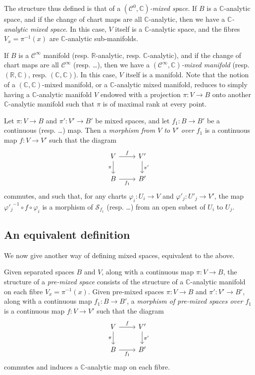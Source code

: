 \documentclass{article}
\theoremstyle{plain}
\theoremstyle{definition}
\newcommand{\RR}{\mathbb{R}}
\newcommand{\CC}{\mathbb{C}}
\newcommand{\oldpage}[1]{\marginpar{\footnotesize$\Big\vert$ \textit{p.~#1}}}
\begin{document}
The structure thus defined is that of a \emph{$(\mathscr{C}^0,\CC)$-mixed space}.
If $B$ is a $\CC$-analytic space, and if the change of chart maps are all $\CC$-analytic, then we have a \emph{$\CC$-analytic mixed space}.
In this case, $V$ itself is a $\CC$-analytic space, and the fibres $V_x=\pi^{-1}(x)$ are $\CC$-analytic sub-manifolds.

If $B$ is a $\mathscr{C}^\infty$ manifold (resp. $\RR$-analytic, resp. $\CC$-analytic), and if the change of chart maps are all $\mathscr{C}^\infty$ (resp. \ldots), then we have a \emph{$(\mathscr{C}^\infty,\CC)$-mixed manifold} (resp. $(\RR,\CC)$, resp. $(\CC,\CC)$).
In this case, $V$ itself is a manifold.
Note that the notion of a $(\CC,\CC)$-mixed manifold, or a $\CC$-analytic mixed manifold, reduces to simply having a $\CC$-analytic manifold $V$ endowed with a projection $\pi\colon V\to B$ onto another $\CC$-analytic manifold such that $\pi$ is of maximal rank at every point.

Let $\pi\colon V\to B$ and $\pi'\colon V'\to B'$ be mixed spaces, and let $f_1\colon B\to B'$ be a continuous (resp. \ldots) map.
Then a \emph{morphism from $V$ to $V'$ over $f_1$} is a continuous map $f\colon V\to V'$ such that the diagram
\[
  \begin{tikzcd}
    V \rar["f"] \dar[swap,"\pi"]
    & V' \dar["\pi'"]
  \\B \rar[swap,"f_1"]
    & B'
  \end{tikzcd}
\]
\oldpage{2-03}
commutes, and such that, for any charts $\varphi_i\colon U_i\to V$ and $\varphi'_j\colon U'_j\to V'$, the map ${\varphi'_j}^{-1}\circ f\circ\varphi_i$ is a morphism of $\mathscr{S}_{f_1}$ (resp. \ldots) from an open subset of $U_i$ to $U_j$.


\subsection{An equivalent definition}
\label{II.2}

We now give another way of defining mixed spaces, equivalent to the above.


Given separated spaces $B$ and $V$, along with a continuous map $\pi\colon V\to B$, the structure of a \emph{pre-mixed space} consists of the structure of a $\CC$-analytic manifold on each fibre $V_x=\pi^{-1}(x)$.
Given pre-mixed spaces $\pi\colon V\to B$ and $\pi'\colon V'\to B'$, along with a continuous map $f_1\colon B\to B'$, a \emph{morphism of pre-mixed spaces over $f_1$} is a continuous map $f\colon V\to V'$ such that the diagram
\[
  \begin{tikzcd}
    V \rar["f"] \dar[swap,"\pi"]
    & V' \dar["\pi'"]
  \\B \rar[swap,"f_1"]
    & B'
  \end{tikzcd}
\]
commutes and induces a $\CC$-analytic map on each fibre.
\end{document}
